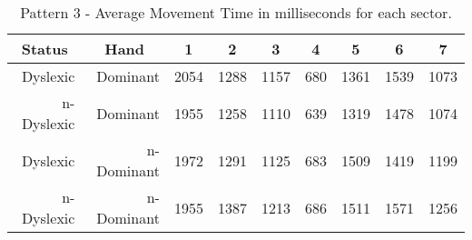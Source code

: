 		\begin{table}[]
			\centering
			\caption{Pattern 3 - Average Movement Time in milliseconds for each sector.}
			\label{tab_pat_3_mt}
			\begin{tabularx}{\textwidth}{|r|r|X|X|X|X|X|X|X|}
				\hline
				\multicolumn{1}{|c|}{\textbf{Status}} & \multicolumn{1}{c|}{\textbf{Hand}} & \multicolumn{1}{c|}{\textbf{1}} & \multicolumn{1}{c|}{\textbf{2}} & \multicolumn{1}{c|}{\textbf{3}} & \multicolumn{1}{c|}{\textbf{4}} & \multicolumn{1}{c|}{\textbf{5}} & \multicolumn{1}{c|}{\textbf{6}} & \multicolumn{1}{c|}{\textbf{7}} \\ \hline
				Dyslexic                              & Dominant                           & 2054       & 1288       & 1157       & 680        & 1361       & 1539       & 1073       \\ \hline
				n-Dyslexic                          & Dominant                           & 1955       & 1258       & 1110       & 639        & 1319       & 1478       & 1074       \\ \hline
				Dyslexic                              & n-Dominant                            & 1972       & 1291       & 1125       & 683        & 1509       & 1419       & 1199       \\ \hline
				n-Dyslexic                          & n-Dominant                            & 1955       & 1387       & 1213       & 686        & 1511       & 1571       & 1256       \\ \hline
			\end{tabularx}
		\end{table}
			
